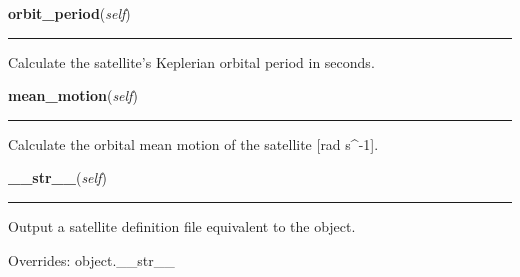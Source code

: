     \label{satstress:SatStress:Satellite:orbit_period}

    \vspace{0.5ex}

\hspace{.8\funcindent}\begin{boxedminipage}{\funcwidth}

    \raggedright \textbf{orbit\_period}(\textit{self})

    \vspace{-1.5ex}

    \rule{\textwidth}{0.5\fboxrule}
\setlength{\parskip}{2ex}
    Calculate the satellite's Keplerian orbital period in seconds.

\setlength{\parskip}{1ex}
    \end{boxedminipage}

    \label{satstress:SatStress:Satellite:mean_motion}

    \vspace{0.5ex}

\hspace{.8\funcindent}\begin{boxedminipage}{\funcwidth}

    \raggedright \textbf{mean\_motion}(\textit{self})

    \vspace{-1.5ex}

    \rule{\textwidth}{0.5\fboxrule}
\setlength{\parskip}{2ex}
    Calculate the orbital mean motion of the satellite [rad 
    s{\textasciicircum}-1].

\setlength{\parskip}{1ex}
    \end{boxedminipage}

    \vspace{0.5ex}

\hspace{.8\funcindent}\begin{boxedminipage}{\funcwidth}

    \raggedright \textbf{\_\_str\_\_}(\textit{self})

    \vspace{-1.5ex}

    \rule{\textwidth}{0.5\fboxrule}
\setlength{\parskip}{2ex}
    Output a satellite definition file equivalent to the object.

\setlength{\parskip}{1ex}
      Overrides: object.\_\_str\_\_

    \end{boxedminipage}


